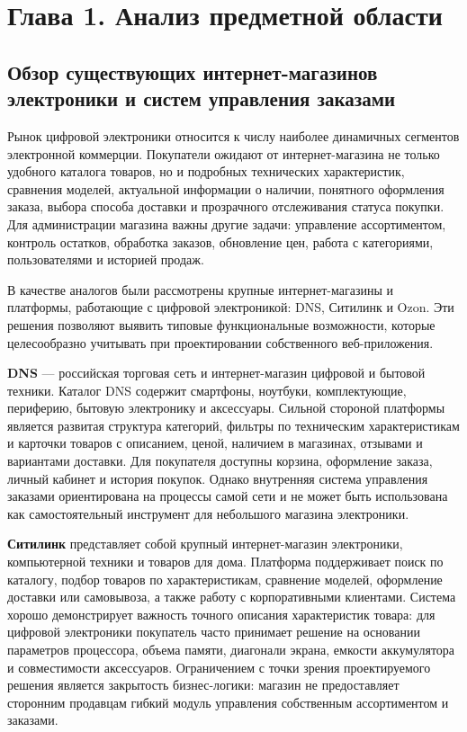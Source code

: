 \section*{Глава 1. Анализ предметной области}

\subsection{Обзор существующих интернет-магазинов электроники и систем управления заказами}

Рынок цифровой электроники относится к числу наиболее динамичных сегментов электронной коммерции. Покупатели ожидают от интернет-магазина не только удобного каталога товаров, но и подробных технических характеристик, сравнения моделей, актуальной информации о наличии, понятного оформления заказа, выбора способа доставки и прозрачного отслеживания статуса покупки. Для администрации магазина важны другие задачи: управление ассортиментом, контроль остатков, обработка заказов, обновление цен, работа с категориями, пользователями и историей продаж.

В качестве аналогов были рассмотрены крупные интернет-магазины и платформы, работающие с цифровой электроникой: DNS, Ситилинк и Ozon. Эти решения позволяют выявить типовые функциональные возможности, которые целесообразно учитывать при проектировании собственного веб-приложения.

\textbf{DNS} --- российская торговая сеть и интернет-магазин цифровой и бытовой техники. Каталог DNS содержит смартфоны, ноутбуки, комплектующие, периферию, бытовую электронику и аксессуары. Сильной стороной платформы является развитая структура категорий, фильтры по техническим характеристикам и карточки товаров с описанием, ценой, наличием в магазинах, отзывами и вариантами доставки. Для покупателя доступны корзина, оформление заказа, личный кабинет и история покупок. Однако внутренняя система управления заказами ориентирована на процессы самой сети и не может быть использована как самостоятельный инструмент для небольшого магазина электроники.

\textbf{Ситилинк} представляет собой крупный интернет-магазин электроники, компьютерной техники и товаров для дома. Платформа поддерживает поиск по каталогу, подбор товаров по характеристикам, сравнение моделей, оформление доставки или самовывоза, а также работу с корпоративными клиентами. Система хорошо демонстрирует важность точного описания характеристик товара: для цифровой электроники покупатель часто принимает решение на основании параметров процессора, объема памяти, диагонали экрана, емкости аккумулятора и совместимости аксессуаров. Ограничением с точки зрения проектируемого решения является закрытость бизнес-логики: магазин не предоставляет сторонним продавцам гибкий модуль управления собственным ассортиментом и заказами.

